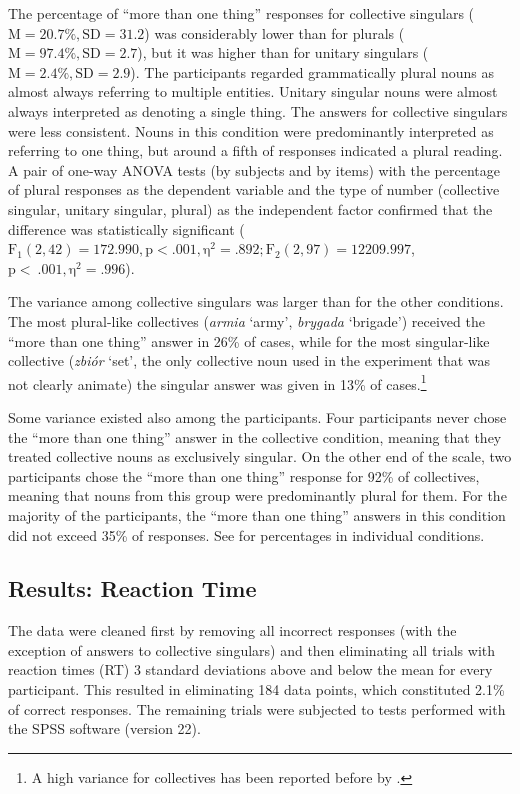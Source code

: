 \documentclass[output=paper]{langscibook}
\begin{document}
The percentage of ``more than one thing'' responses for collective singulars ($\text{M}=20.7\%, \text{SD}=31.2$) was considerably lower than for plurals ($\text{M}=97.4\%, \text{SD}=2.7$), but it was higher than for unitary singulars ($\text{M}=2.4\%, \text{SD}=2.9$). The participants regarded grammatically plural nouns as almost always referring to multiple entities. Unitary singular nouns were almost always interpreted as denoting a single thing.  The answers for collective singulars were less consistent. Nouns in this condition were predominantly interpreted as referring to one thing, but around a fifth of responses indicated a plural reading. A pair of one-way ANOVA tests (by subjects and by items) with the percentage of plural responses as the dependent variable and the type of number (collective singular, unitary singular, plural) as the independent factor confirmed that the difference was statistically significant ($\text{F}_{1}(2,42)=172.990, \text{p}<.001, \text{η}^{2}=.892; \text{F}_{2}(2,97)=12209.997$, $\text{p}<~.001, \text{η}^{2}=.996$).

The variance among collective singulars was larger than for the other conditions. The most plural-like collectives (\textit{armia} ‘army’, \textit{brygada} ‘brigade’) received the ``more than one thing'' answer in 26\% of cases, while for the most singular-like collective (\textit{zbiór} ‘set’, the only collective noun used in the experiment that was not clearly animate) the singular answer was given in 13\% of cases.\footnote{A high variance for collectives has been reported before by \citet{nenonenMismatchesGrammaticalNumber2010}.}

Some variance existed also among the participants. Four participants never chose the ``more than one thing'' answer in the collective condition, meaning that they treated collective nouns as exclusively singular. On the other end of the scale, two participants chose the ``more than one thing'' response for 92\% of collectives, meaning that nouns from this group were predominantly plural for them. For the majority of the participants, the ``more than one thing'' answers in this condition did not exceed 35\% of responses. See  for percentages in individual conditions.

\subsection{Results: Reaction Time}
The data were cleaned first by removing all incorrect responses (with the exception of answers to collective singulars) %
and then eliminating all trials with reaction times (RT) 3 standard deviations above and below the mean for every participant.\footnotemark{} This resulted in eliminating 184 data points, which constituted 2.1\% of correct responses. The remaining trials were subjected to tests performed with the SPSS software (version 22).
\end{document}
